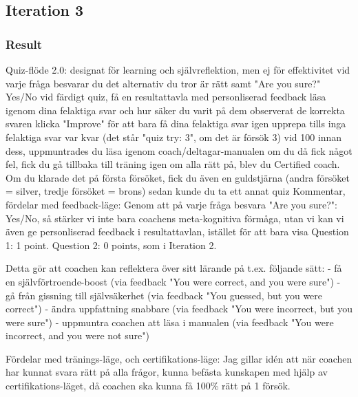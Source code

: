 \subsection{Iteration 3}

  \subsubsection{Result}
  Quiz-flöde 2.0: designat för learning och självreflektion, men ej för effektivitet
  vid varje fråga besvarar du det alternativ du tror är rätt samt "Are you sure?" Yes/No
  vid färdigt quiz, få en resultattavla med personliserad feedback
  läsa igenom dina felaktiga svar och hur säker du varit på dem
  observerat de korrekta svaren
  klicka "Improve" för att bara få dina felaktiga svar igen
  upprepa tills inga felaktiga svar var kvar (det står "quiz try: 3", om det är försök 3)
  vid 100%
  innan dess, uppmuntrades du läsa igenom coach/deltagar-manualen
  om du då fick något fel, fick du gå tillbaka till träning igen
  om alla rätt på, blev du Certified coach. Om du klarade det på första försöket, fick du även en guldstjärna (andra försöket = silver, tredje försöket = brons)
  sedan kunde du ta ett annat quiz
  Kommentar, fördelar med feedback-läge:
  Genom att på varje fråga besvara "Are you sure?": Yes/No, så stärker vi inte bara coachens meta-kognitiva förmåga, utan vi kan vi även ge personliserad feedback i resultattavlan, istället för att bara visa Question 1: 1 point. Question 2: 0 points, som i Iteration 2.

  Detta gör att coachen kan reflektera över sitt lärande på t.ex. följande sätt:
  - få en självförtroende-boost (via feedback "You were correct, and you were sure")
  - gå från gissning till självsäkerhet (via feedback "You guessed, but you were correct")
  - ändra uppfattning snabbare (via feedback "You were incorrect, but you were sure")
  - uppmuntra coachen att läsa i manualen (via feedback "You were incorrect, and you were not sure")

  Fördelar med tränings-läge, och certifikations-läge:
  Jag gillar idén att när coachen har kunnat svara rätt på alla frågor, kunna befästa kunskapen med hjälp av certifikations-läget, då coachen ska kunna få 100\% rätt på 1 försök.
